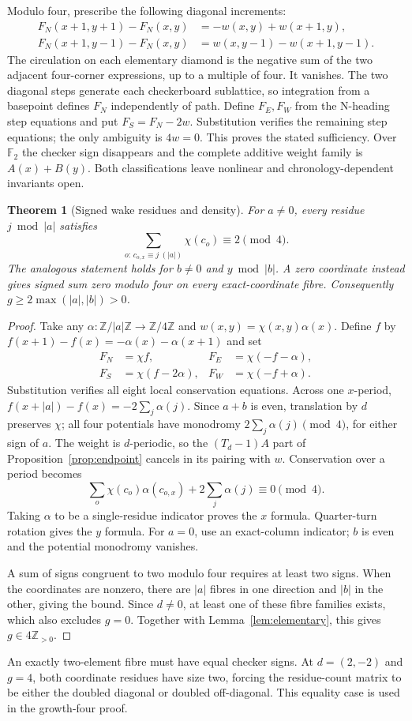 \documentclass[11pt,letterpaper]{article}
\newtheorem{theorem}{Theorem}[section]
\newcommand{\F}{\mathbb F}
\newcommand{\che}{\chi}
\newcommand{\Z}{\mathbb Z}
\begin{document}
Modulo four, prescribe the following diagonal increments:
\[
\begin{aligned}
F_N(x+1,y+1)-F_N(x,y)&=-w(x,y)+w(x+1,y),\\
F_N(x+1,y-1)-F_N(x,y)&=w(x,y-1)-w(x+1,y-1).
\end{aligned}
\]
The circulation on each elementary diamond is the negative sum of the
two adjacent four-corner expressions, up to a multiple of four. It
vanishes. The two diagonal steps generate each checkerboard sublattice,
so integration from a basepoint defines $F_N$ independently of path.
Define $F_E,F_W$ from the N-heading step equations and put
$F_S=F_N-2w$. Substitution verifies the remaining step equations;
the only ambiguity is $4w=0$. This proves the stated sufficiency.
Over $\F_2$ the checker sign disappears and the complete additive
weight family is $A(x)+B(y)$. Both classifications leave nonlinear and chronology-dependent invariants open.

\begin{theorem}[Signed wake residues and density]\label{thm:density}
For $a\ne0$, every residue $j\bmod|a|$ satisfies
\[
\sum_{o:\,c_{o,x}\equiv j\ (|a|)}\che(c_o)\equiv2\pmod4.
\]
The analogous statement holds for $b\ne0$ and $y\bmod|b|$.
A zero coordinate instead gives signed sum zero modulo four on every
exact-coordinate fibre. Consequently
$g\ge2\max(|a|,|b|)>0$.
\end{theorem}
\begin{proof}
Take any $\alpha:\Z/|a|\Z\to\Z/4\Z$ and
$w(x,y)=\che(x,y)\alpha(x)$. Define $f$ by
$f(x+1)-f(x)=-\alpha(x)-\alpha(x+1)$ and set
\[
\begin{aligned}
F_N&=\che f,& F_E&=\che(-f-\alpha),\\
F_S&=\che(f-2\alpha),&F_W&=\che(-f+\alpha).
\end{aligned}
\]
Substitution verifies all eight local conservation equations. Across one
$x$-period, $f(x+|a|)-f(x)=-2\sum_j\alpha(j)$. Since $a+b$ is
even, translation by $d$ preserves $\che$; all four potentials have
monodromy $2\sum_j\alpha(j)\pmod4$, for either sign of $a$.
The weight is $d$-periodic, so the $(T_d-1)A$ part of
Proposition~\ref{prop:endpoint} cancels in its pairing with $w$.
Conservation over a period becomes
\[
\sum_o\che(c_o)\alpha(c_{o,x})+2\sum_j\alpha(j)\equiv0\pmod4.
\]
Taking $\alpha$ to be a single-residue indicator proves the $x$ formula.
Quarter-turn rotation gives the $y$ formula. For $a=0$, use an
exact-column indicator; $b$ is even and the potential monodromy vanishes.

A sum of signs congruent to two modulo four requires at least two signs.
When the coordinates are nonzero, there are $|a|$ fibres in one direction
and $|b|$ in the other, giving the bound. Since $d\ne0$, at least one
of these fibre families exists, which also excludes $g=0$. Together with Lemma~\ref{lem:elementary},
this gives $g\in4\Z_{>0}$.
\end{proof}
An exactly two-element fibre must have equal checker signs. At
$d=(2,-2)$ and $g=4$, both coordinate residues have size two, forcing
the residue-count matrix to be either the doubled diagonal or doubled
off-diagonal. This equality case is used in the growth-four proof.
\end{document}
